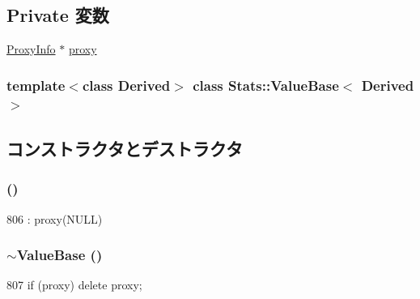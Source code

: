 \subsection*{Private 変数}
\begin{DoxyCompactItemize}
\item 
\hyperlink{classStats_1_1ProxyInfo}{ProxyInfo} $\ast$ \hyperlink{classStats_1_1ValueBase_a3afc53fa5e063d851b5f9af7ad1b05b7}{proxy}
\end{DoxyCompactItemize}
\subsubsection*{template$<$class Derived$>$ class Stats::ValueBase$<$ Derived $>$}



\subsection{コンストラクタとデストラクタ}
\hypertarget{classStats_1_1ValueBase_a38d678a727aba419ecd2d61f5c09f888}{
\subsubsection[{ValueBase}]{ ()}}
\label{classStats_1_1ValueBase_a38d678a727aba419ecd2d61f5c09f888}



\begin{DoxyCode}
806 : proxy(NULL) { }
\end{DoxyCode}
\hypertarget{classStats_1_1ValueBase_ab56bf71328d47bae61dcfa424b8ca3b7}{
\subsubsection[{$\sim$ValueBase}]{\setlength{\rightskip}{0pt plus 5cm}$\sim${\bf ValueBase} ()}}
\label{classStats_1_1ValueBase_ab56bf71328d47bae61dcfa424b8ca3b7}



\begin{DoxyCode}
807 { if (proxy) delete proxy; }
\end{DoxyCode}


